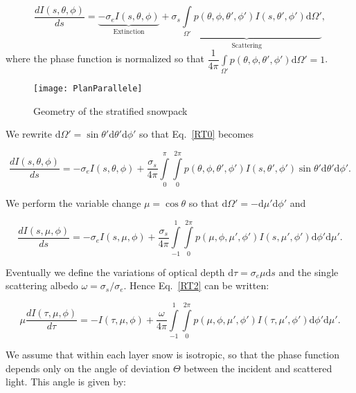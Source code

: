 \documentclass[a4paper,11pt]{article}
\begin{document}
\begin{equation}
\dfrac{dI(s,\theta,\phi)}{ds}=\underbrace{-\sigma_e I(s,\theta,\phi)}_{\textrm{Extinction}}+\underbrace{\sigma_s\displaystyle\int\limits_{\Omega'}p(\theta,\phi,\theta',\phi')I(s,\theta',\phi')\mathrm{d}\Omega'}_{\textrm{Scattering}},
\label{RT0}
\end{equation}
where the phase function is normalized so that $\dfrac{1}{4\pi}\displaystyle\int\limits_{\Omega'}p(\theta,\phi,\theta',\phi')\mathrm{d}\Omega'=1$.

\begin{figure}[ht]
\centering
\texttt{[image: PlanParallele]}
\caption{Geometry of the stratified snowpack}
\label{PlanParallele}
\end{figure} 

\noindent We rewrite $\mathrm{d}\Omega'=\sin\theta'\mathrm{d}\theta'\mathrm{d}\phi'$ so that Eq.~\ref{RT0} becomes

\begin{equation}
\dfrac{dI(s,\theta,\phi)}{ds}=-\sigma_e I(s,\theta,\phi)+\dfrac{\sigma_s}{4\pi}\displaystyle\int\limits_{0}^{\pi}\displaystyle\int\limits_{0}^{2\pi}p(\theta,\phi,\theta',\phi')I(s,\theta',\phi')\sin\theta'\mathrm{d}\theta'\mathrm{d}\phi'.
\label{RT1}
\end{equation}

\noindent We perform the variable change $\mu=\cos\theta$ so that $\mathrm{d}\Omega'=-\mathrm{d}\mu'\mathrm{d}\phi'$ and

\begin{equation}
\dfrac{dI(s,\mu,\phi)}{ds}=-\sigma_e I(s,\mu,\phi)+\dfrac{\sigma_s}{4\pi}\displaystyle\int\limits_{-1}^{1}\displaystyle\int\limits_{0}^{2\pi}p(\mu,\phi,\mu',\phi')I(s,\mu',\phi')\mathrm{d}\phi' \mathrm{d} \mu'.
\label{RT2}
\end{equation}

\noindent Eventually we define the variations of optical depth $\mathrm{d}\tau= \sigma_e \mu \mathrm{d}s$ and the single scattering albedo $\omega=\sigma_s/\sigma_e$. Hence Eq.~\ref{RT2} can be written: 

\begin{equation}
\mu\dfrac{dI(\tau,\mu,\phi)}{d\tau}= -I(\tau,\mu,\phi)+\dfrac{\omega}{4\pi}\displaystyle\int\limits_{-1}^{1}\displaystyle\int\limits_{0}^{2\pi}p(\mu,\phi,\mu',\phi')I(\tau,\mu',\phi')\mathrm{d}\phi' \mathrm{d} \mu'.
\label{RT3}
\end{equation}

\noindent We assume that within each layer snow is isotropic, so that the phase function depends only on the angle of deviation $\Theta$ between the incident and scattered light. This angle is given by:
\end{document}
